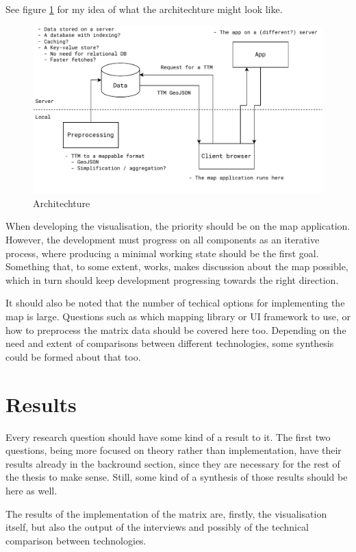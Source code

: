 \documentclass[12pt]{article}
\begin{document}
See figure \ref{fig:architechture} for my idea of what the architechture might look like.

\begin{figure}[H]
	\centering
	\includegraphics[width=1\textwidth]{images/architechture}
	\caption{Architechture}
	\label{fig:architechture}
\end{figure}

When developing the visualisation, the priority should be on the map application.
However, the development must progress on all components as an iterative process,
where producing a minimal working state should be the first goal.
Something that, to some extent, works, makes discussion about the map possible,
which in turn should keep development progressing towards the right direction.

It should also be noted that the number of techical options for implementing the map is large.
Questions such as which mapping library or UI framework to use,
or how to preprocess the matrix data should be covered here too.
Depending on the need and extent of comparisons between different technologies,
some synthesis could be formed about that too.

\section{Results}

Every research question should have some kind of a result to it.
The first two questions, being more focused on theory rather than implementation,
have their results already in the backround section,
since they are necessary for the rest of the thesis to make sense.
Still, some kind of a synthesis of those results should be here as well.

The results of the implementation of the matrix are, firstly, the visualisation itself,
but also the output of the interviews
and possibly of the technical comparison between technologies.
\end{document}
